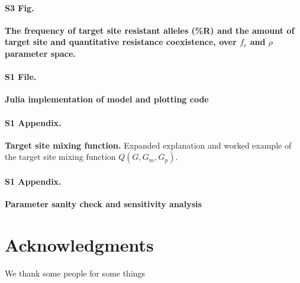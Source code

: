 \documentclass[10pt,letterpaper]{article}
\begin{document}
\paragraph*{S3 Fig.}
\label{S3_Fig}
{\bf The frequency of target site resistant alleles (\%R) and the amount of target site and quantitative resistance coexistence, over $f_r$ and $\rho$ parameter space.} 

\paragraph*{S1 File.}
\label{S1_File}
{\bf Julia implementation of model and plotting code}  

\paragraph*{S1 Appendix.}
\label{S1_Appendix}
{\bf Target site mixing function.} 
Expanded explanation and worked example of the target site mixing function $Q(G, G_m, G_p)$.

\paragraph*{S1 Appendix.}
\label{S2_Appendix}
{\bf Parameter sanity check and sensitivity analysis} 

\section*{Acknowledgments}
We thank some people for some things

\nolinenumbers

%
% 
%




% 

\end{document}
